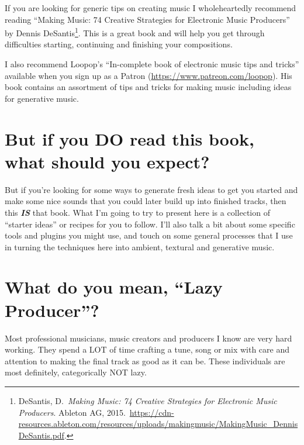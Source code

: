 \documentclass[
  12pt,
  letterpaper,
  oneside,
  open=any]{scrbook}
\begin{document}
If you are looking for generic tips on creating music I wholeheartedly
recommend reading ``Making Music: 74 Creative Strategies for Electronic
Music Producers'' by Dennis DeSantis\footnote{DeSantis, D.~\emph{Making
  Music: 74 Creative Strategies for Electronic Music Producers}. Ableton
  AG,
  2015.~\url{https://cdn-resources.ableton.com/resources/uploads/makingmusic/MakingMusic_DennisDeSantis.pdf}.}.
This is a great book and will help you get through difficulties
starting, continuing and finishing your compositions.

I also recommend Loopop's ``In-complete book of electronic music tips
and tricks'' available when you sign up as a Patron
(\url{https://www.patreon.com/loopop}). His book contains an assortment
of tips and tricks for making music including ideas for generative
music.

\section*{But if you DO read this book, what should you
expect?}\label{but-if-you-do-read-this-book-what-should-you-expect}


But if you're looking for some ways to generate fresh ideas to get you
started and make some nice sounds that you could later build up into
finished tracks, then this \textbf{\emph{IS}} that book. What I'm going
to try to present here is a collection of ``starter ideas'' or recipes
for you to follow. I'll also talk a bit about some specific tools and
plugins you might use, and touch on some general processes that I use in
turning the techniques here into ambient, textural and generative music.

\section*{What do you mean, ``Lazy
Producer''?}\label{what-do-you-mean-lazy-producer}


Most professional musicians, music creators and producers I know are
very hard working. They spend a LOT of time crafting a tune, song or mix
with care and attention to making the final track as good as it can be.
These individuals are most definitely, categorically NOT lazy.
\end{document}
